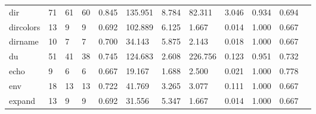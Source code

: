 \begin{longtable}{lp{1.00cm}p{1.00cm}p{1.00cm}p{1.00cm}p{1.00cm}p{1.00cm}p{1.00cm}p{1.00cm}p{1.00cm}p{1.00cm}p{1.00cm}}
dir       &                           71 &                 61 &                                60 &                                      0.845 &                                135.951 &                                        8.784 &                            82.311 &                                   3.046 &                        0.934 &                                        0.694 \\
dircolors &                           13 &                  9 &                                 9 &                                      0.692 &                                102.889 &                                        6.125 &                             1.667 &                                   0.014 &                        1.000 &                                        0.667 \\
dirname   &                           10 &                  7 &                                 7 &                                      0.700 &                                 34.143 &                                        5.875 &                             2.143 &                                   0.018 &                        1.000 &                                        0.667 \\
du        &                           51 &                 41 &                                38 &                                      0.745 &                                124.683 &                                        2.608 &                           226.756 &                                   0.123 &                        0.951 &                                        0.732 \\
echo      &                            9 &                  6 &                                 6 &                                      0.667 &                                 19.167 &                                        1.688 &                             2.500 &                                   0.021 &                        1.000 &                                        0.778 \\
env       &                           18 &                 13 &                                13 &                                      0.722 &                                 41.769 &                                        3.265 &                             3.077 &                                   0.111 &                        1.000 &                                        0.667 \\
expand    &                           13 &                  9 &                                 9 &                                      0.692 &                                 31.556 &                                        5.347 &                             1.667 &                                   0.014 &                        1.000 &                                        0.667 \\

\end{longtable}
